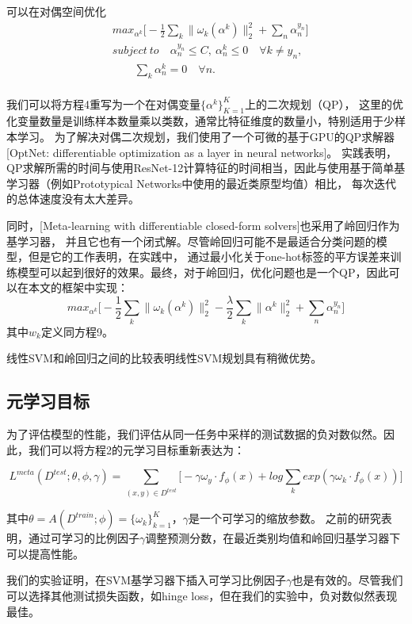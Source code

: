 可以在对偶空间优化  
\begin{equation}
    \begin{aligned}
        &max_{\alpha ^{k}} \big[ -\frac{1}{2} \sum_{k}\parallel\omega_{k}(\alpha^{k})\parallel_{2}^{2} + \sum_{n}\alpha_{n}^{y_{n}}\big]\\ 
        &subject \ to \quad \alpha_{n}^{y_{n}} \leq C, \ \alpha_{n}^{k} \leq 0 \quad \forall k \neq y_{n} , \\ 
        &\qquad \sum_{k}{\alpha_{n}^{k}=0 \quad \forall n.}\\
    \end{aligned}
\end{equation}

我们可以将方程4重写为一个在对偶变量$\{\alpha^k\}^K_{K=1}$上的二次规划（QP），
这里的优化变量数量是训练样本数量乘以类数，通常比特征维度的数量小，特别适用于少样本学习。
为了解决对偶二次规划，我们使用了一个可微的基于GPU的QP求解器[OptNet: differentiable optimization as a layer in neural networks]。
实践表明，QP求解所需的时间与使用ResNet-12计算特征的时间相当，因此与使用基于简单基学习器（例如Prototypical Networks中使用的最近类原型均值）相比，
每次迭代的总体速度没有太大差异。

同时，[Meta-learning with differentiable closed-form solvers]也采用了岭回归作为基学习器，
并且它也有一个闭式解。尽管岭回归可能不是最适合分类问题的模型，但是它的工作表明，在实践中，
通过最小化关于one-hot标签的平方误差来训练模型可以起到很好的效果。最终，对于岭回归，优化问题也是一个QP，因此可以在本文的框架中实现：
\begin{equation}
    max_{\alpha^{k}} \big[ - \frac{1}{2} \sum_{k} \parallel\omega_{k}(\alpha^{k}) \parallel_{2}^{2} - \frac{\lambda}{2} \sum_{k}{\parallel\alpha^{k}\parallel_{2}^{2}}+\sum_{n}{\alpha_{n}^{y_{n}}} \big] 
\end{equation}
其中$w_k$定义同方程9。

线性SVM和岭回归之间的比较表明线性SVM规划具有稍微优势。

\subsection{元学习目标}

为了评估模型的性能，我们评估从同一任务中采样的测试数据的负对数似然。因此，我们可以将方程2的元学习目标重新表达为：

\begin{equation}
    L^{meta}(D^{test};\theta,\phi,\gamma)=\sum_{(x,y) \in D^{test}}{ \big[ -\gamma \omega_{y} \cdot f_{\phi}(x) + log\sum_{k}{exp(\gamma\omega_{k}\cdot f_{\phi}(x))}\big]}
\end{equation}

其中$\theta=A(D^{train};\phi)=\{\omega_{k}\}_{k=1}^{K}$，$\gamma$是一个可学习的缩放参数。
之前的研究表明，通过可学习的比例因子$\gamma$调整预测分数，在最近类别均值和岭回归基学习器下可以提高性能。

我们的实验证明，在SVM基学习器下插入可学习比例因子$\gamma$也是有效的。尽管我们可以选择其他测试损失函数，如hinge loss，但在我们的实验中，负对数似然表现最佳。